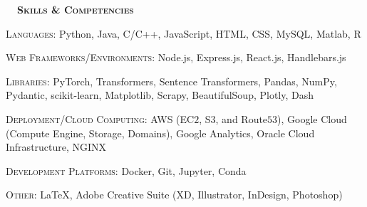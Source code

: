 \documentclass[hidelinks, 10pt]{article}
\def\sectiontocontentspacing{4mm}   %
\renewcommand{\section}[1]{
    {\fontsize{14}{14}\selectfont \textsc{\textbf{\ \ #1\ \ }}}\hrulefill
}
\begin{document}

\section{Skills \& Competencies}

\vspace{\sectiontocontentspacing}

\begin{minipage}[ct]{0.9\linewidth}
    \textsc{Languages: } Python, Java, C/C++, JavaScript, HTML, CSS, MySQL, Matlab, R



    \vspace{1.5mm}

    \textsc{Web Frameworks/Environments: } Node.js, Express.js, React.js, Handlebars.js

    \vspace{1.5mm}

    \textsc{Libraries: } PyTorch, Transformers, Sentence Transformers, Pandas, NumPy, Pydantic, scikit-learn, Matplotlib, Scrapy,
    BeautifulSoup, Plotly, Dash

    \vspace{1.5mm}

    \textsc{Deployment/Cloud Computing:} AWS (EC$2$, S$3$, and Route$53$),
    Google Cloud (Compute Engine, Storage, Domains), Google Analytics, Oracle Cloud Infrastructure, NGINX

    \vspace{1.5mm}

    \textsc{Development Platforms: } Docker, Git, Jupyter, Conda



    \vspace{1.5mm}

    \textsc{Other: } \LaTeX, Adobe Creative Suite (XD, Illustrator, InDesign, Photoshop)
\end{minipage}
\end{document}
